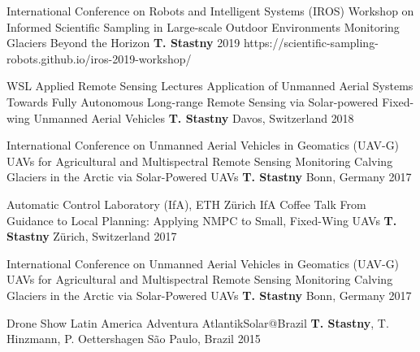\label{sec:talks}

\begin{cventries}

\cvtalkentry
	{International Conference on Robots and Intelligent Systems (IROS)} %
	{Workshop on Informed Scientific Sampling in Large-scale Outdoor Environments} %
	{Monitoring Glaciers Beyond the Horizon} %
	{\textbf{T. Stastny}} %
	{} %
	{2019} %
	{https://scientific-sampling-robots.github.io/iros-2019-workshop/} %
	
\cvtalkentry
	{WSL Applied Remote Sensing Lectures} %
	{Application of Unmanned Aerial Systems} %
	{Towards Fully Autonomous Long-range Remote Sensing via Solar-powered Fixed-wing Unmanned Aerial Vehicles} %
	{\textbf{T. Stastny}} %
	{Davos, Switzerland} %
	{2018} %
	{} %

\cvtalkentry
	{International Conference on Unmanned Aerial Vehicles in Geomatics (UAV-G)} %
	{UAVs for Agricultural and Multispectral Remote Sensing} %
	{Monitoring Calving Glaciers in the Arctic via Solar-Powered UAVs} %
	{\textbf{T. Stastny}} %
	{Bonn, Germany} %
	{2017} %
	{} %
		
\cvtalkentry
	{Automatic Control Laboratory (IfA), ETH Z\"{u}rich} %
	{IfA Coffee Talk} %
	{From Guidance to Local Planning: Applying NMPC to Small, Fixed-Wing UAVs} %
	{\textbf{T. Stastny}} %
	{Z\"{u}rich, Switzerland} %
	{2017} %
	{} %

\cvtalkentry
	{International Conference on Unmanned Aerial Vehicles in Geomatics (UAV-G)} %
	{UAVs for Agricultural and Multispectral Remote Sensing} %
	{Monitoring Calving Glaciers in the Arctic via Solar-Powered UAVs} %
	{\textbf{T. Stastny}} %
	{Bonn, Germany} %
	{2017} %
	{} %
		
\cvtalkentry
	{Drone Show Latin America} %
	{} %
	{Adventura AtlantikSolar@Brazil} %
	{\textbf{T. Stastny}, T. Hinzmann, P. Oettershagen} %
	{S\~{a}o Paulo, Brazil} %
	{2015} %
	{} %

\end{cventries}
